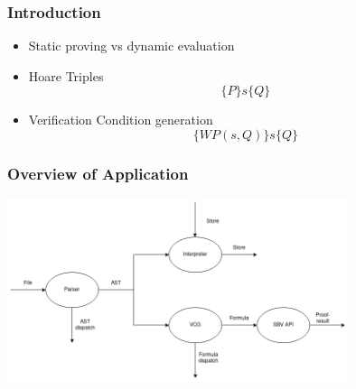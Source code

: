 
\begin{frame}[c]
  \frametitle{Introduction}
  \begin{itemize}
  \item Static proving vs dynamic evaluation
    \item Hoare Triples
          $$ \{P\}s\{Q\}$$
    \item Verification Condition generation
          $$ \{WP(s,Q)\}s\{Q\}$$
  \end{itemize}
\end{frame}

\begin{frame}[c]
  \frametitle{Overview of Application🌮}
  \includegraphics[width=10cm]{IFCapp}
\end{frame}
